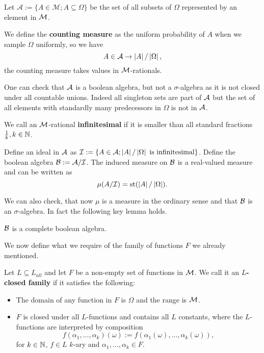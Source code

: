 \begin{defi}
Let $\mathcal{A}:=\{A\in\mathcal{M};A\subseteq \Omega\}$ be the set of all subsets of $\Omega$ represented by an element in $\mathcal{M}$.

We define the \textbf{counting measure} as the uniform probability of $A$ when we sample $\Omega$ uniformly, so we have
\[A\in\mathcal{A} \to \left|{A}\right|/\left|{\Omega}\right|,\]
the counting measure takes values in $\mathcal{M}$-rationals.
\end{defi}

One can check that $\mathcal{A}$ is a boolean algebra, but not a $\sigma$-algebra as it is not closed under all countable unions. Indeed all singleton sets are part of $\mathcal{A}$ but the set of all elements with standardly many predecessors in $\Omega$ is not in $\mathcal{A}$.

\begin{defi}
We call an $\mathcal{M}$-rational \textbf{infinitesimal} if it is smaller than all standard fractions $\frac{1}{k},k\in\mathbb{N}$.

Define an ideal in $\mathcal{A}$ as $\mathcal{I}:=\{A\in\mathcal{A};\left|{A}\right|/\left|{\Omega}\right|\text{ is infinitesimal}\}$. Define the boolean algebra $\mathcal{B}:=\mathcal{A}/\mathcal{I}$. The induced measure on $\mathcal{B}$ is a real-valued measure and can be written as \[\mu(A/\mathcal{I})=\text{st}(\left|{A}\right|/\left|{\Omega}\right|).\]
\end{defi}

We can also check, that now $\mu$ is a measure in the ordinary sense and that $\mathcal{B}$ is an $\sigma$-algebra. In fact the following key lemma holds.

\begin{lemm}
$\mathcal{B}$ is a complete boolean algebra.
\end{lemm}

We now define what we require of the family of functions $F$ we already mentioned.

\begin{defi}
Let $L\subseteq L_{all}$ and let $F$ be a non-empty set of functions in $\mathcal{M}$. We call it an \textbf{$L$-closed family} if it satisfies the following:
\begin{itemize}
\item The domain of any function in $F$ is $\Omega$ and the range is $\mathcal{M}$.
\item $F$ is closed under all $L$-functions and contains all $L$ constants, where the $L$-functions are interpreted by composition
\[f(\alpha_1,\dots,\alpha_k)(\omega):=f(\alpha_1(\omega),\dots,\alpha_k(\omega)),\]
for $k\in\mathbb{N}$, $f\in L$ $k$-ary and $\alpha_1,\dots,\alpha_k\in F$.
\end{itemize}
\end{defi}

